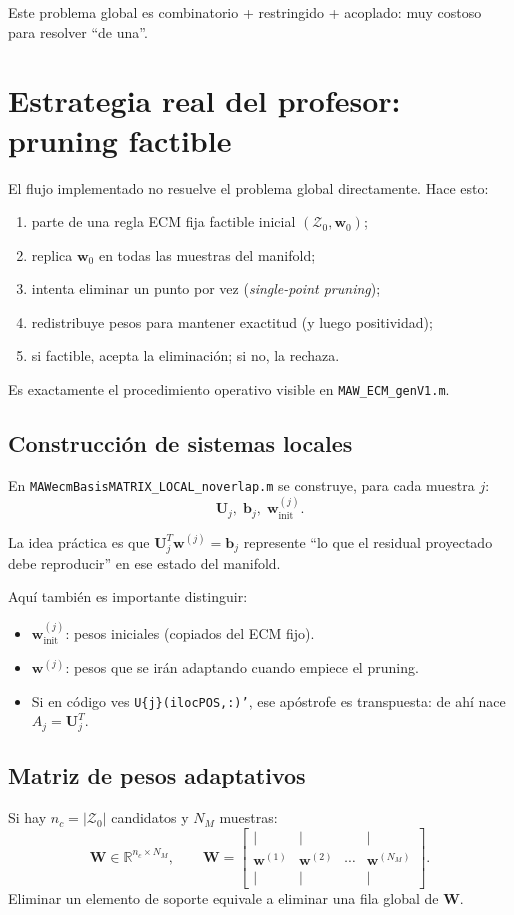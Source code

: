 \documentclass[11pt,a4paper]{article}
\newcommand{\W}{\bm W}
\newcommand{\U}{\bm U}
\begin{document}
Este problema global es combinatorio + restringido + acoplado: muy costoso para
resolver ``de una''.

\section{Estrategia real del profesor: pruning factible}
El flujo implementado no resuelve el problema global directamente.
Hace esto:
\begin{enumerate}[leftmargin=1.2cm]
    \item parte de una regla ECM fija factible inicial $(\mathcal Z_0,\bm w_0)$;
    \item replica $\bm w_0$ en todas las muestras del manifold;
    \item intenta eliminar un punto por vez (\emph{single-point pruning});
    \item redistribuye pesos para mantener exactitud (y luego positividad);
    \item si factible, acepta la eliminaci\'on; si no, la rechaza.
\end{enumerate}

Es exactamente el procedimiento operativo visible en \texttt{MAW\_ECM\_genV1.m}.

\subsection{Construcci\'on de sistemas locales}
En \texttt{MAWecmBasisMATRIX\_LOCAL\_noverlap.m} se construye, para cada muestra
$j$:
\[
\U_j,\;\bm b_j,\;\bm w^{(j)}_{\text{init}}.
\]

La idea pr\'actica es que $\U_j^T\bm w^{(j)}=\bm b_j$ represente
``lo que el residual proyectado debe reproducir'' en ese estado del manifold.

Aqu\'i tambi\'en es importante distinguir:
\begin{itemize}[leftmargin=0.8cm]
    \item $\bm w^{(j)}_{\text{init}}$: pesos iniciales (copiados del ECM fijo).
    \item $\bm w^{(j)}$: pesos que se ir\'an adaptando cuando empiece el pruning.
    \item Si en c\'odigo ves \texttt{U\{j\}(ilocPOS,:)'}, ese ap\'ostrofe es transpuesta:
    de ah\'i nace $A_j=\U_j^T$.
\end{itemize}

\subsection{Matriz de pesos adaptativos}
Si hay $n_c=|\mathcal Z_0|$ candidatos y $N_M$ muestras:
\[
\W \in \mathbb R^{n_c\times N_M},\qquad
\W=
\begin{bmatrix}
| & | & & |\\
\bm w^{(1)} & \bm w^{(2)} & \cdots & \bm w^{(N_M)}\\
| & | & & |
\end{bmatrix}.
\]
Eliminar un elemento de soporte equivale a eliminar una fila global de $\W$.
\end{document}
